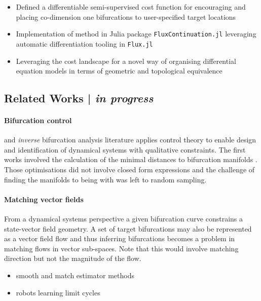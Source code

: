 \begin{itemize}
    \item Defined a differentiable semi-supervised cost function for encouraging and placing co-dimension one bifurcations to user-specified target locations
    \item Implementation of method in Julia package \texttt{FluxContinuation.jl} leveraging automatic differentiation tooling in \texttt{Flux.jl}
    \item Leveraging the cost landscape for a novel way of organising differential equation models in terms of geometric and topological equivalence
\end{itemize}

\subsection{Related Works | \textit{in progress}}

\paragraph{Bifurcation control} and \textit{inverse} bifurcation analysis literature applies control theory to enable design and identification of dynamical systems with qualitative constraints. The first works involved the calculation of the minimal distances to bifurcation manifolds \cite{Iwasaki1997AnType,Lu2006InverseSystems,Dobson2004DistanceBifurcations}. Those optimisations did not involve closed form expressions and the challenge of finding the manifolds to being with was left to random sampling.

\paragraph{Matching vector fields} From a dynamical systems perspective a given bifurcation curve constrains a state-vector field geometry. A set of target bifurcations may also be represented as a vector field flow and thus inferring bifurcations becomes a problem in matching flows in vector sub-spaces. Note that this would involve matching direction but not the magnitude of the flow.

\begin{itemize}
    \item smooth and match estimator methods \cite{Ranciati2017BayesianParameters}
    \item robots learning limit cycles \cite{Khadivar2021LearningBifurcations}
\end{itemize}

